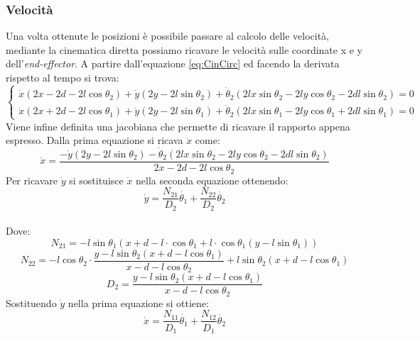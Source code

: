 \subsubsection{Velocità}\label{sec:CalcoloVelCin}
Una volta ottenute le posizioni è possibile passare al calcolo delle velocità, mediante la cinematica diretta possiamo ricavare le velocità sulle coordinate x e y dell'\textit{end-effector}. A partire dall'equazione \ref{eq:CinCirc} ed facendo la derivata rispetto al tempo si trova:
\begin{equation*}
	\begin{cases}
	\dot{x}(2x-2d-2l\cos\theta_2) +\dot{y}(2y-2l\sin\theta_2) + \dot{\theta}_2(2lx\sin\theta_2-2ly\cos\theta_2-2dl\sin\theta_2)= 0 \\
	\dot{x}(2x+2d-2l\cos\theta_1) +\dot{y}(2y-2l\sin\theta_1) + \dot{\theta}_2(2lx\sin\theta_1-2ly\cos\theta_1+2dl\sin\theta_1)= 0
	\end{cases}
\end{equation*}
 Viene infine definita una jacobiana che permette di ricavare il rapporto appena espresso. Dalla prima equazione si ricava $\dot{x}$ come:
 \begin{equation*}
 	\dot{x} = \frac{-\dot{y}(2y-2l\sin\theta_2) -\dot{\theta}_2(2lx\sin\theta_2-2ly\cos\theta_2-2dl\sin\theta_2)}{2x-2d-2l\cos\theta_2}
 \end{equation*}
Per ricavare $\dot{y}$ si sostituisce $\dot{x}$ nella seconda equazione ottenendo:
\begin{equation*}
	\dot{y} = \frac{N_{21}}{D_2}\dot{\theta_1} + \frac{N_{22}}{D_2}\dot{\theta_2}
\end{equation*}
\\Dove:
\begin{equation*}
    N_{21} = -l\sin\theta_1 (x+d-l\cdot \cos\theta_1 + l\cdot \cos\theta_1 (y-l\sin\theta_1))
\end{equation*}
\begin{equation*}
    N_{22} = -l\cos\theta_2\cdot \frac{y-l\sin\theta_2 (x+d-l\cos\theta_1)}{x-d-l \cos\theta_2} +l\sin\theta_2(x+d-l\cos\theta_1)
\end{equation*}
\begin{equation*}
 D_2 = \frac{y-l\sin\theta_2 (x+d-l\cos\theta_1)}{x-d-l\cos\theta_2}
\end{equation*}
Sostituendo $\dot{y}$ nella prima equazione si ottiene: 
\begin{equation*}
	\dot{x} = \frac{N_{11}}{D_1} \dot{\theta_1} + \frac{N_{12}}{D_1}\dot{\theta_2}
\end{equation*}
